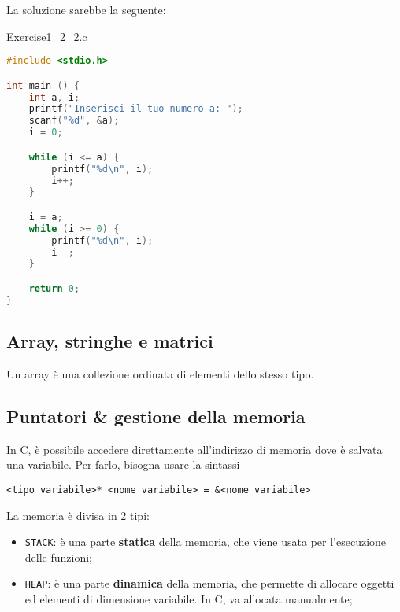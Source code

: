 La soluzione sarebbe la seguente:
\pagebreak
\begin{codeblock}{Exercise1\_2\_2.c}
    \begin{lstlisting}[language = c]
#include <stdio.h>

int main () {
    int a, i;
    printf("Inserisci il tuo numero a: ");
    scanf("%d", &a);
    i = 0;

    while (i <= a) {
        printf("%d\n", i);
        i++;
    }

    i = a;
    while (i >= 0) {
        printf("%d\n", i);
        i--;
    }

    return 0;
}\end{lstlisting}
\end{codeblock}

\subsection{Array, stringhe e matrici}

Un array è una collezione ordinata di elementi dello stesso tipo.

\subsection{Puntatori \texorpdfstring{\&}{&} gestione della memoria}

In C, è possibile accedere direttamente all'indirizzo di memoria dove è salvata una variabile. Per farlo, bisogna usare la sintassi 

\begin{center}
    \verb|<tipo variabile>* <nome variabile> = &<nome variabile>|
\end{center}

La memoria è divisa in 2 tipi:
\begin{itemize}
    \item \verb|STACK|: è una parte \textbf{statica} della memoria, che viene usata per l'esecuzione delle funzioni;
    \item \verb|HEAP|: è una parte \textbf{dinamica} della memoria, che permette di allocare oggetti ed elementi di dimensione variabile. In C, va allocata manualmente;
\end{itemize}

